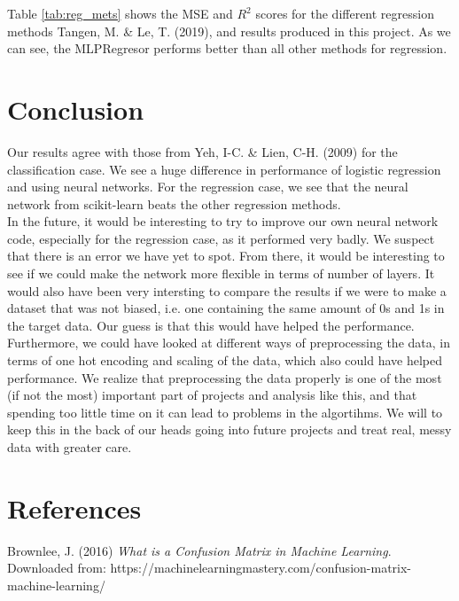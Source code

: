 \documentclass[11pt,english, A4]{article}
\begin{document}
Table \ref{tab:reg_mets} shows the MSE and $R^{2}$ scores for the different regression methods Tangen, M. \& Le, T. (2019), and results produced in this project. As we can see, the MLPRegresor performs better than all other methods for regression. 


\section{Conclusion}

Our results agree with those from Yeh, I-C. \& Lien, C-H. (2009) for the classification case. We see a huge difference in performance of logistic regression and using neural networks. For the regression case, we see that the neural network from scikit-learn beats the other regression methods. \\

In the future, it would be interesting to try to improve our own neural network code, especially for the regression case, as it performed very badly. We suspect that there is an error we have yet to spot. From there, it would be interesting to see if we could make the network more flexible in terms of number of layers. It would also have been very intersting to compare the results if we were to make a dataset that was not biased, i.e. one containing the same amount of 0s and 1s in the target data. Our guess is that this would have helped the performance. Furthermore, we could have looked at different ways of preprocessing the data, in terms of one hot encoding and scaling of the data, which also could have helped performance. We realize that preprocessing the data properly is one of the most (if not the most) important part of projects and analysis like this, and that spending too little time on it can lead to problems in the algortihms. We will to keep this in the back of our heads going into future projects and treat real, messy data with greater care.

\newpage 
\section{References}

Brownlee, J. (2016) \textit{What is a Confusion Matrix in Machine Learning}.\\
Downloaded from: https://machinelearningmastery.com/confusion-matrix-machine-learning/\\
\end{document}
